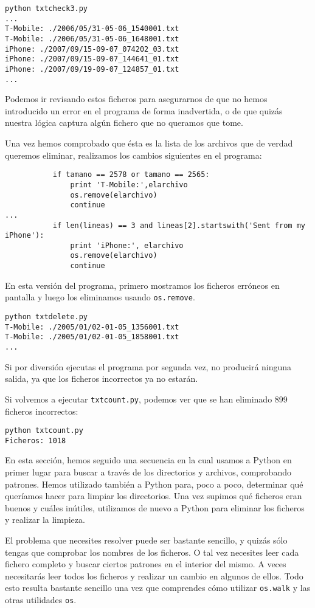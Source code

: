 \beforeverb
\begin{verbatim}
python txtcheck3.py
...
T-Mobile: ./2006/05/31-05-06_1540001.txt
T-Mobile: ./2006/05/31-05-06_1648001.txt
iPhone: ./2007/09/15-09-07_074202_03.txt
iPhone: ./2007/09/15-09-07_144641_01.txt
iPhone: ./2007/09/19-09-07_124857_01.txt
...
\end{verbatim}
\afterverb
%
Podemos ir revisando estos ficheros para asegurarnos de que no hemos
introducido un error en el programa de forma inadvertida, o de que quizás
nuestra lógica captura algún fichero que no queramos que tome.

Una vez hemos comprobado que ésta es la lista de los archivos que de verdad queremos eliminar,
realizamos los cambios siguientes en el programa:

\beforeverb
\begin{verbatim}
           if tamano == 2578 or tamano == 2565:
               print 'T-Mobile:',elarchivo
               os.remove(elarchivo)
               continue
...
           if len(lineas) == 3 and lineas[2].startswith('Sent from my iPhone'):
               print 'iPhone:', elarchivo
               os.remove(elarchivo)
               continue
\end{verbatim}
\afterverb
%
En esta versión del programa, primero mostramos los ficheros erróneos
en pantalla y luego los eliminamos
usando {\tt os.remove}.

\beforeverb
\begin{verbatim}
python txtdelete.py 
T-Mobile: ./2005/01/02-01-05_1356001.txt
T-Mobile: ./2005/01/02-01-05_1858001.txt
...
\end{verbatim}
\afterverb
%
Si por diversión ejecutas el programa por segunda vez, no producirá ninguna salida,
ya que los ficheros incorrectos ya no estarán.

Si volvemos a ejecutar {\tt txtcount.py}, podemos ver que se han eliminado
899 ficheros incorrectos:
\beforeverb
\begin{verbatim}
python txtcount.py 
Ficheros: 1018
\end{verbatim}
\afterverb
%
En esta sección, hemos seguido una secuencia en la cual usamos a
Python en primer lugar para buscar a través de los directorios y archivos, comprobando
patrones. Hemos utilizado también a Python para, poco a poco, determinar qué queríamos
hacer para limpiar los directorios. Una vez supimos
qué ficheros eran buenos y cuáles inútiles, utilizamos de nuevo a Python
para eliminar los ficheros y realizar la limpieza.

El problema que necesites resolver puede ser bastante sencillo,
y quizás sólo tengas que comprobar los nombres de los ficheros.
O tal vez necesites leer cada fichero completo y buscar ciertos patrones en el
interior del mismo. A veces necesitarás
leer todos los ficheros y realizar un cambio en
algunos de ellos. Todo esto resulta bastante
sencillo una vez que comprendes cómo utilizar {\tt os.walk}
y las otras utilidades {\tt os}.

